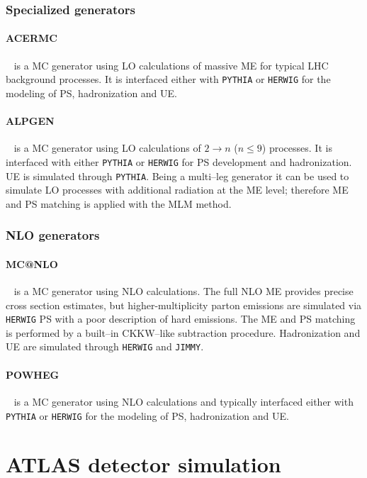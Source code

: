\subsubsection*{Specialized generators}

\paragraph{ACERMC}~\cite{acermc} is a MC generator using LO
calculations of massive ME for typical LHC background processes. It is
interfaced either with \texttt{PYTHIA} or \texttt{HERWIG} for the
modeling of PS, hadronization and UE.

\paragraph{ALPGEN}~\cite{alpgen} is a MC generator using LO calculations
of $2 \to n$ ($n\leq 9$) processes. It is interfaced with either
\texttt{PYTHIA} or \texttt{HERWIG} for PS development and
hadronization. UE is simulated through \texttt{PYTHIA}. Being a
multi--leg generator it can be used to simulate LO processes with
additional radiation at the ME level; therefore ME and PS matching is
applied with the MLM method.

\subsubsection*{NLO generators}

\paragraph{MC@NLO}~\cite{mcatnlo} is a MC generator using NLO
calculations. The full NLO ME provides precise cross section
estimates, but higher-multiplicity parton emissions are simulated via
\texttt{HERWIG} PS with a poor description of hard emissions. The ME
and PS matching is performed by a built--in CKKW--like subtraction
procedure.
Hadronization and UE are simulated through \texttt{HERWIG} and
\texttt{JIMMY}.

\paragraph{POWHEG}~\cite{powheg} is a MC generator using NLO
calculations and typically interfaced either with \texttt{PYTHIA} or
\texttt{HERWIG} for the modeling of PS, hadronization and UE.

\section{ATLAS detector simulation}
\label{sec:detectorsim}

